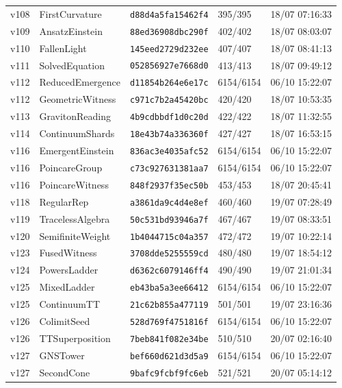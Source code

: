 \documentclass[11pt]{article}
\theoremstyle{definition}\newtheorem{deriv}{Derivação}
\begin{document}
{\begin{longtable}{@{}lllll@{}}
v108 & FirstCurvature & \texttt{d88d4a5fa15462f4} & 395/395 & 18/07 07:16:33 \\
v109 & AnsatzEinstein & \texttt{88ed36908dbc290f} & 402/402 & 18/07 08:03:07 \\
v110 & FallenLight & \texttt{145eed2729d232ee} & 407/407 & 18/07 08:41:13 \\
v111 & SolvedEquation & \texttt{052856927e7668d0} & 413/413 & 18/07 09:49:12 \\
v112 & ReducedEmergence & \texttt{d11854b264e6e17c} & 6154/6154 & 06/10 15:22:07 \\
v112 & GeometricWitness & \texttt{c971c7b2a45420bc} & 420/420 & 18/07 10:53:35 \\
v113 & GravitonReading & \texttt{4b9cdbbdf1d0c20d} & 422/422 & 18/07 11:32:55 \\
v114 & ContinuumShards & \texttt{18e43b74a336360f} & 427/427 & 18/07 16:53:15 \\
v116 & EmergentEinstein & \texttt{836ac3e4035afc52} & 6154/6154 & 06/10 15:22:07 \\
v116 & PoincareGroup & \texttt{c73c927631381aa7} & 6154/6154 & 06/10 15:22:07 \\
v116 & PoincareWitness & \texttt{848f2937f35ec50b} & 453/453 & 18/07 20:45:41 \\
v118 & RegularRep & \texttt{a3861da9c4d4e8ef} & 460/460 & 19/07 07:28:49 \\
v119 & TracelessAlgebra & \texttt{50c531bd93946a7f} & 467/467 & 19/07 08:33:51 \\
v120 & SemifiniteWeight & \texttt{1b4044715c04a357} & 472/472 & 19/07 10:22:14 \\
v123 & FusedWitness & \texttt{3708dde5255559cd} & 480/480 & 19/07 18:54:12 \\
v124 & PowersLadder & \texttt{d6362c6079146ff4} & 490/490 & 19/07 21:01:34 \\
v125 & MixedLadder & \texttt{eb43ba5a3ee66412} & 6154/6154 & 06/10 15:22:07 \\
v125 & ContinuumTT & \texttt{21c62b855a477119} & 501/501 & 19/07 23:16:36 \\
v126 & ColimitSeed & \texttt{528d769f4751816f} & 6154/6154 & 06/10 15:22:07 \\
v126 & TTSuperposition & \texttt{7beb841f082e34be} & 510/510 & 20/07 02:16:40 \\
v127 & GNSTower & \texttt{bef660d621d3d5a9} & 6154/6154 & 06/10 15:22:07 \\
v127 & SecondCone & \texttt{9bafc9fcbf9fc6eb} & 521/521 & 20/07 05:14:12 \\

\end{longtable}}
\end{document}
